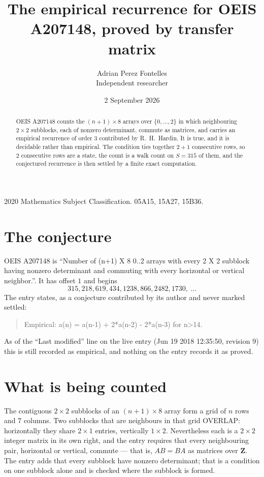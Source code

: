 \documentclass[11pt,a4paper]{article}
\title{The empirical recurrence for OEIS A207148, proved by transfer matrix}
\author{Adrian Perez Fontelles\\ \small Independent researcher}
\date{2 September 2026}
\theoremstyle{plain}
\theoremstyle{definition}
\begin{document}
\maketitle

\begin{abstract}
OEIS A207148 counts the $(n+1)\times8$ arrays over $\{0,\dots,2\}$ in which
neighbouring $2\times2$ subblocks, each of nonzero determinant, commute as matrices, and carries an empirical
recurrence
of order $3$ contributed by R.~H.~Hardin. It is true, and it is decidable rather than
empirical. The condition ties together $2+1$ consecutive rows, so $2$ consecutive rows are
a state, the count is a walk count on $S=315$ of them, and the conjectured recurrence is then
settled by a finite exact computation.
\end{abstract}

\noindent\small 2020 Mathematics Subject Classification. 05A15, 15A27, 15B36.\normalsize

\section{The conjecture}

OEIS A207148 is ``Number of (n+1) X 8 0..2 arrays with every 2 X 2 subblock having nonzero determinant and commuting with every horizontal or vertical neighbor.''. It has offset $1$ and begins
\[
315, 218, 619, 434, 1238, 866, 2482, 1730,\ \dots
\]
The entry states, as a conjecture contributed by its author and never marked settled:
\begin{quote}
Empirical: a(n) = a(n-1) + 2*a(n-2) - 2*a(n-3) for n>14.
\end{quote}
As of the ``Last modified'' line on the live entry (Jun 19 2018 12:35:50, revision 9) this is still
recorded as empirical, and nothing on the entry records it as proved.

\section{What is being counted}

The contiguous $2\times2$ subblocks of an $(n+1)\times8$ array form a grid of $n$
rows and $7$ columns. Two subblocks that are neighbours in that
grid OVERLAP: horizontally they share $2\times1$ entries, vertically
$1\times2$. Nevertheless each is a $2\times2$ integer matrix in its own right, and
the entry requires that every neighbouring pair, horizontal or vertical, commute --- that is,
$AB=BA$ as matrices over $\mathbf{Z}$. The entry adds that every subblock have nonzero determinant; that is a condition on one subblock alone and is checked where the subblock is formed.
\end{document}
